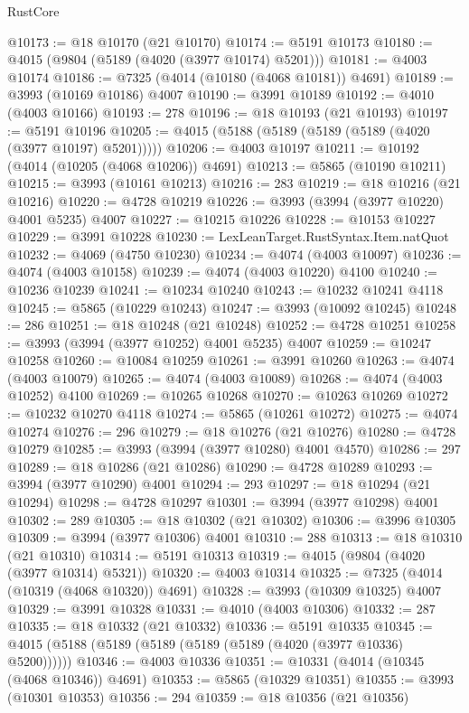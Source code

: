 \begin{lexlean}{RustCore}
\begin{coremodule}
@10173 := @18 @10170 (@21 @10170)
@10174 := @5191 @10173
@10180 := @4015 (@9804 (@5189 (@4020 (@3977 @10174) @5201)))
@10181 := @4003 @10174
@10186 := @7325 (@4014 (@10180 (@4068 @10181)) @4691)
@10189 := @3993 (@10169 @10186) @4007
@10190 := @3991 @10189
@10192 := @4010 (@4003 @10166)
@10193 := 278
@10196 := @18 @10193 (@21 @10193)
@10197 := @5191 @10196
@10205 := @4015 (@5188 (@5189 (@5189 (@5189 (@4020 (@3977 @10197) @5201)))))
@10206 := @4003 @10197
@10211 := @10192 (@4014 (@10205 (@4068 @10206)) @4691)
@10213 := @5865 (@10190 @10211)
@10215 := @3993 (@10161 @10213)
@10216 := 283
@10219 := @18 @10216 (@21 @10216)
@10220 := @4728 @10219
@10226 := @3993 (@3994 (@3977 @10220) @4001 @5235) @4007
@10227 := @10215 @10226
@10228 := @10153 @10227
@10229 := @3991 @10228
@10230 := LexLeanTarget.RustSyntax.Item.natQuot
@10232 := @4069 (@4750 @10230)
@10234 := @4074 (@4003 @10097)
@10236 := @4074 (@4003 @10158)
@10239 := @4074 (@4003 @10220) @4100
@10240 := @10236 @10239
@10241 := @10234 @10240
@10243 := @10232 @10241 @4118
@10245 := @5865 (@10229 @10243)
@10247 := @3993 (@10092 @10245)
@10248 := 286
@10251 := @18 @10248 (@21 @10248)
@10252 := @4728 @10251
@10258 := @3993 (@3994 (@3977 @10252) @4001 @5235) @4007
@10259 := @10247 @10258
@10260 := @10084 @10259
@10261 := @3991 @10260
@10263 := @4074 (@4003 @10079)
@10265 := @4074 (@4003 @10089)
@10268 := @4074 (@4003 @10252) @4100
@10269 := @10265 @10268
@10270 := @10263 @10269
@10272 := @10232 @10270 @4118
@10274 := @5865 (@10261 @10272)
@10275 := @4074 @10274
@10276 := 296
@10279 := @18 @10276 (@21 @10276)
@10280 := @4728 @10279
@10285 := @3993 (@3994 (@3977 @10280) @4001 @4570)
@10286 := 297
@10289 := @18 @10286 (@21 @10286)
@10290 := @4728 @10289
@10293 := @3994 (@3977 @10290) @4001
@10294 := 293
@10297 := @18 @10294 (@21 @10294)
@10298 := @4728 @10297
@10301 := @3994 (@3977 @10298) @4001
@10302 := 289
@10305 := @18 @10302 (@21 @10302)
@10306 := @3996 @10305
@10309 := @3994 (@3977 @10306) @4001
@10310 := 288
@10313 := @18 @10310 (@21 @10310)
@10314 := @5191 @10313
@10319 := @4015 (@9804 (@4020 (@3977 @10314) @5321))
@10320 := @4003 @10314
@10325 := @7325 (@4014 (@10319 (@4068 @10320)) @4691)
@10328 := @3993 (@10309 @10325) @4007
@10329 := @3991 @10328
@10331 := @4010 (@4003 @10306)
@10332 := 287
@10335 := @18 @10332 (@21 @10332)
@10336 := @5191 @10335
@10345 := @4015 (@5188 (@5189 (@5189 (@5189 (@5189 (@4020 (@3977 @10336) @5200))))))
@10346 := @4003 @10336
@10351 := @10331 (@4014 (@10345 (@4068 @10346)) @4691)
@10353 := @5865 (@10329 @10351)
@10355 := @3993 (@10301 @10353)
@10356 := 294
@10359 := @18 @10356 (@21 @10356)

\end{coremodule}
\end{lexlean}
